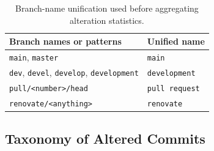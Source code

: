 \begin{table}[h]
\centering
\caption{Branch-name unification used before aggregating alteration statistics.}
\label{tab:hist-branch-unification}
\begin{tabular}{ll}
\hline
\textbf{Branch names or patterns} & \textbf{Unified name} \\
\hline
\texttt{main}, \texttt{master} & \texttt{main} \\
\texttt{dev}, \texttt{devel}, \texttt{develop}, \texttt{development} & \texttt{development} \\
\texttt{pull/<number>/head} & \texttt{pull request} \\
\texttt{renovate/<anything>} & \texttt{renovate} \\
\hline
\end{tabular}
\end{table}

\subsection{Taxonomy of Altered Commits}
\label{subsec:hist-classification}

